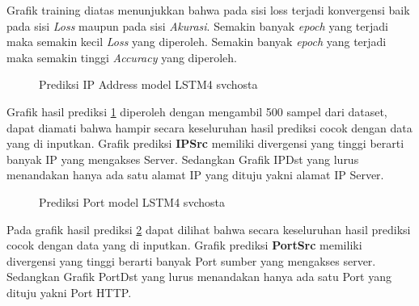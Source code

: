 \documentclass[./skripsi.tex]{subfiles}
\begin{document}
\par Grafik training diatas menunjukkan bahwa pada sisi loss terjadi konvergensi baik pada sisi \textit{Loss} maupun pada sisi \textit{Akurasi}. Semakin banyak \textit{epoch} yang terjadi maka semakin kecil \textit{Loss} yang diperoleh. Semakin banyak \textit{epoch} yang terjadi maka semakin tinggi \textit{Accuracy} yang diperoleh.

\begin{figure}%
    \centering
    \caption{Prediksi IP Address model LSTM4 svchosta}
    \label{fig:lstm4_svchosta_pred1}
\end{figure}

\par Grafik hasil prediksi \ref{fig:lstm4_svchosta_pred1} diperoleh dengan mengambil 500 sampel dari dataset, dapat diamati bahwa hampir secara keseluruhan hasil prediksi cocok dengan data yang di inputkan. Grafik prediksi \textbf{IPSrc} memiliki divergensi yang tinggi berarti banyak IP yang mengakses Server. Sedangkan Grafik IPDst yang lurus menandakan hanya ada satu alamat IP yang dituju yakni alamat IP Server.


\begin{figure}%
    \centering
    \caption{Prediksi Port model LSTM4 svchosta}
    \label{fig:lstm4_svchosta_pred2}
\end{figure}

\par Pada grafik hasil prediksi \ref{fig:lstm4_svchosta_pred2} dapat dilihat bahwa secara keseluruhan hasil prediksi cocok dengan data yang di inputkan. Grafik prediksi \textbf{PortSrc} memiliki divergensi yang tinggi berarti banyak Port sumber yang mengakses server. Sedangkan Grafik PortDst yang lurus menandakan hanya ada satu Port yang dituju yakni Port HTTP.
\end{document}
